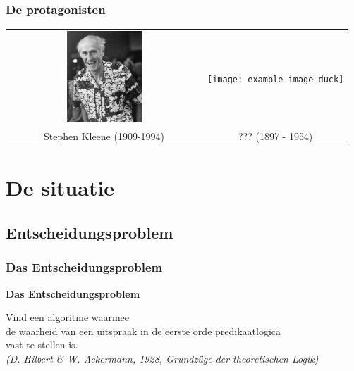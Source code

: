 \documentclass{beamer}
\begin{document}
\begin{frame}
    \frametitle{De protagonisten}
    \begin{tabular*}{\textwidth}{c c}
        \includegraphics[width=0.4\textwidth]{Kleene.jpeg} & \texttt{[image: example-image-duck]} \\
        {\large Stephen Kleene} (1909-1994) & {\large ???} (1897 - 1954)\\
    \end{tabular*}
\end{frame}

\section{De situatie}
\subsection{Entscheidungsproblem}
\begin{frame}
    \frametitle{Das Entscheidungsproblem}
    {\large \textbf{Das Entscheidungsproblem}}

    \begin{center}
        Vind een algoritme waarmee \\ 
        de waarheid van een uitspraak in de eerste orde predikaatlogica \\
        vast te stellen is.
        \\
        \bigskip
        {\small \emph{(D. Hilbert \& W. Ackermann, 1928, Grundzüge der theoretischen Logik)}}
    \end{center}
\end{frame}
\end{document}
